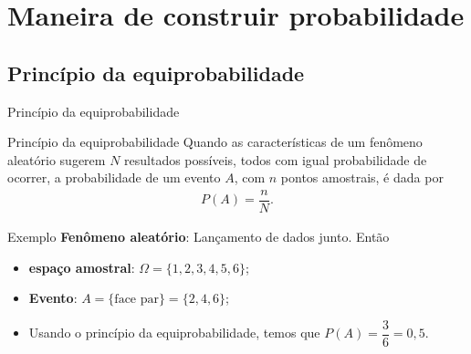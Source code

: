\documentclass[9pt]{beamer}
\begin{document}
\section{Maneira de construir probabilidade}
\subsection{Princípio da equiprobabilidade}
\begin{frame}{Princípio da equiprobabilidade}
	\begin{block}{Princípio da equiprobabilidade}
		Quando as características de um fenômeno aleatório sugerem $N$ resultados possíveis, todos com igual probabilidade de ocorrer, a probabilidade de um evento $A$, com $n$ pontos amostrais, é dada por
		\begin{align*}
		P(A) = \dfrac{n}{N}.
		\end{align*}
	\end{block}
	\begin{block}{Exemplo}
		\textbf{Fenômeno aleatório}: Lançamento de dados junto. Então
		\begin{itemize}
			\item \textbf{espaço amostral}: $\Omega = \{ 1, 2, 3, 4, 5, 6 \}$;
			\item \textbf{Evento}: $A = \{\mbox{face par}\} = \{2, 4, 6\}$;
			\item Usando o princípio da equiprobabilidade, temos que $P(A) = \dfrac{3}{6} = 0,5$.
		\end{itemize}
	\end{block}
\end{frame}

\end{document}

